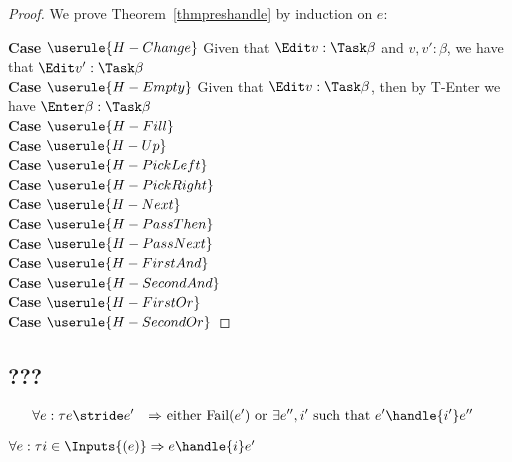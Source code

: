 \begin{proof}
  We prove Theorem~\ref{thmpreshandle} by induction on $e$:

  \noindent\textbf{Case} $\userule{H-Change}$ Given that $\Edit v:\Task\beta$ and $v,v':\beta$, we have that $\Edit v':\Task\beta$\\

  \noindent\textbf{Case} $\userule{H-Empty}$ Given that $\Edit v:\Task\beta$, then by T-Enter we have $\Enter \beta:\Task\beta$ \\

  \noindent\textbf{Case} $\userule{H-Fill}$ \\

  \noindent\textbf{Case} $\userule{H-Up}$ \\

  \noindent\textbf{Case} $\userule{H-PickLeft}$ \\

  \noindent\textbf{Case} $\userule{H-PickRight}$ \\

  \noindent\textbf{Case} $\userule{H-Next}$ \\

  \noindent\textbf{Case} $\userule{H-PassThen}$ \\

  \noindent\textbf{Case} $\userule{H-PassNext}$ \\

  \noindent\textbf{Case} $\userule{H-FirstAnd}$ \\

  \noindent\textbf{Case} $\userule{H-SecondAnd}$ \\

  \noindent\textbf{Case} $\userule{H-FirstOr}$ \\

  \noindent\textbf{Case} $\userule{H-SecondOr}$
\end{proof}
\subsection{???}

\begin{align*}
  \forall e:\tau & e \stride e' &\implies& \text{ either Fail}(e') \text{ or } \exists e'',i' \text{ such that } e'\handle{i'}e''&\\
\end{align*}

\begin{theorem}
  $\forall e:\tau i\in\Inputs{(e)} \implies e\handle{i}e'$
\end{theorem}

